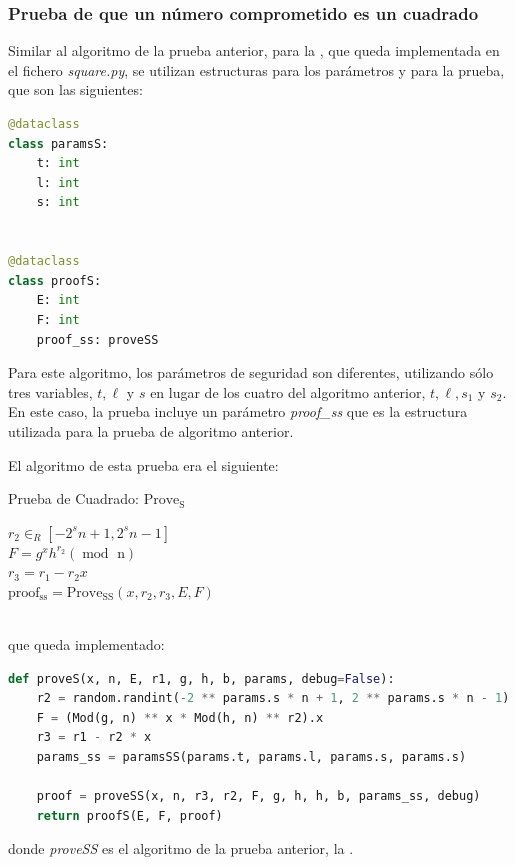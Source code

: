 \subsubsection{Prueba de que un número comprometido es un cuadrado}

Similar al algoritmo de la prueba anterior, para la , que queda implementada en el fichero \emph{square.py}, se utilizan estructuras para los parámetros y para la prueba, que son las siguientes:
\begin{lstlisting}[language=Python, basicstyle=\footnotesize]
@dataclass
class paramsS:
    t: int
    l: int
    s: int


@dataclass
class proofS:
    E: int
    F: int
    proof_ss: proveSS
\end{lstlisting}

Para este algoritmo, los parámetros de seguridad son diferentes, utilizando sólo tres variables, $t, \ell$ y $s$ en lugar de los cuatro del algoritmo anterior, $t, \ell, s_{1}$ y $s_{2}$. En este caso, la prueba incluye un parámetro \textit{proof\_ss} que es la estructura utilizada para la prueba de algoritmo anterior.

El algoritmo de esta prueba era el siguiente: \\
\begin{minipage}{0.9\textwidth}
    \begin{algorithm}[H]
        \caption{Prueba de Cuadrado: $\operatorname{Prove_{S}}$}

        $r_{2} \in_{R} [-2^{s}n+1, 2^{s}n-1]$ \\
        $F = g^{x}h^{r_{2}} (\operatorname{mod} \text{ n})$ \\
        $r_{3} = r_{1} - r_{2}x$ \\
        $\operatorname{proof_{ss}} = \operatorname{Prove_{SS}}(x, r_{2}, r_{3}, E, F)$ \\

    \end{algorithm}
\end{minipage} \\
que queda implementado:
\begin{lstlisting}[language=Python, basicstyle=\footnotesize]
def proveS(x, n, E, r1, g, h, b, params, debug=False):
    r2 = random.randint(-2 ** params.s * n + 1, 2 ** params.s * n - 1)
    F = (Mod(g, n) ** x * Mod(h, n) ** r2).x
    r3 = r1 - r2 * x
    params_ss = paramsSS(params.t, params.l, params.s, params.s)

    proof = proveSS(x, n, r3, r2, F, g, h, h, b, params_ss, debug)
    return proofS(E, F, proof)
\end{lstlisting}
donde \textit{proveSS} es el algoritmo de la prueba anterior, la .

